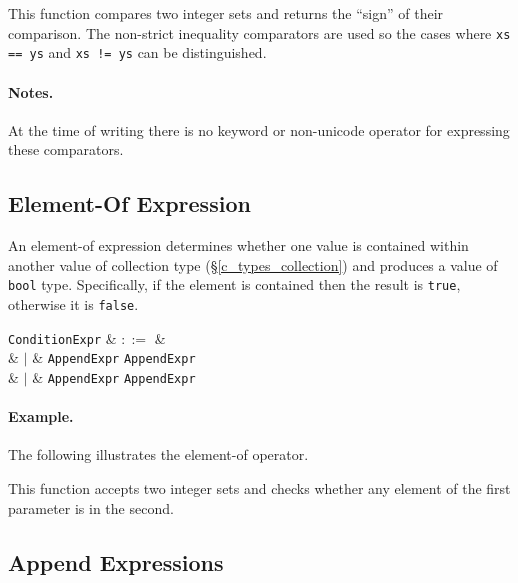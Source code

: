 

This function compares two integer sets and returns the ``sign'' of their comparison.  The non-strict inequality comparators are used so the cases where \lstinline{xs == ys} and \lstinline{xs != ys} can be distinguished.

\paragraph{Notes.}  At the time of writing there is no keyword or non-unicode operator for expressing these comparators.

\subsection{Element-Of Expression}
\label{c_expr_relational}
An element-of expression determines whether one value is contained within another value of collection type (\S\ref{c_types_collection}) and produces a value of \lstinline{bool} type.  Specifically, if the element is contained then the result is \lstinline{true}, otherwise it is \lstinline{false}.

\begin{syntax}
  \verb+ConditionExpr+ & $::=$ &\\
  & $|$ & \verb+AppendExpr+  \verb+AppendExpr+\\
  & $|$ & \verb+AppendExpr+ \token{$\in$} \verb+AppendExpr+\\
\end{syntax}

\paragraph{Example.}  The following illustrates the element-of operator.



This function accepts two integer sets and checks whether any element of the first parameter is in the second.


\subsection{Append Expressions}
\label{c_expr_append}

